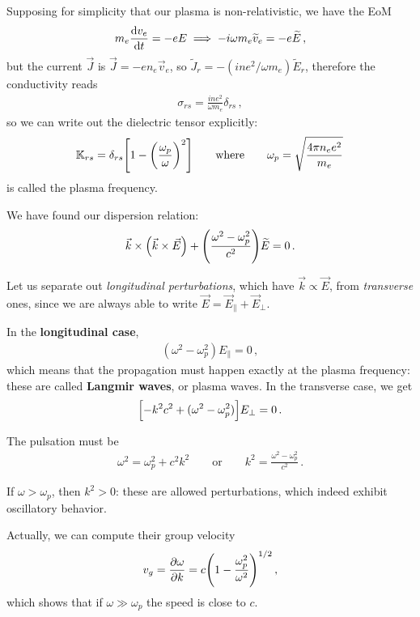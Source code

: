 \documentclass[main.tex]{subfiles}
\begin{document}
Supposing for simplicity  that our plasma is non-relativistic, we have the EoM 
%
\begin{align}
m_e \dv{v_e}{t} = - e E \implies 
- i \omega m_e \widetilde{v}_e = - e \widetilde{E}
\,,
\end{align}
%
but the current \(\vec{J}\) is \(\vec{J} = - e n_e \vec{v}_e\), so \(\widetilde{J}_r = - (i n e^2 / \omega m_e) \widetilde{E}_r\), therefore the conductivity reads 
%
\begin{align}
\sigma_{rs} = \frac{i n e^2}{\omega m_e} \delta_{rs} 
\,,
\end{align}
%
so we can write out the dielectric tensor explicitly: 
%
\begin{align}
\mathbb{K}_{rs} = \delta_{rs} \qty[ 1 - \qty(\frac{\omega_p}{\omega })^2]
\qquad \text{where} \qquad
\omega_p = \sqrt{\frac{ 4 \pi n_e e^2}{m_e}}
\,
\end{align}
%
is called the plasma frequency.

We have found our dispersion relation: 
%
\begin{align}
\vec{k} \times \qty(\vec{k} \times \vec{E})
+ \qty(\frac{\omega^2 - \omega _p^2}{c^2}) \widetilde{E} = 0
\,.
\end{align}

Let us separate out \emph{longitudinal perturbations}, which have \(\vec{k} \propto \vec{E}\), from \emph{transverse} ones, since we are always able to write \(\vec{E} = \vec{E}_\parallel + \vec{E}_\perp\). 

In the \textbf{longitudinal case},
%
\begin{align}
(\omega^2 - \omega _p^2) E_{\parallel} = 0
\,,
\end{align}
%
which means that the propagation must happen exactly at the plasma frequency: these are called \textbf{Langmir waves}, or plasma waves. 
In the transverse case, we get 
%
\begin{align}
\qty[ - k^2 c^2 + (\omega^2 - \omega _p^2)] E_\perp = 0
\,.
\end{align}

The pulsation must be 
%
\begin{align}
\omega^2 = \omega _p^2 + c^2 k^2
\qquad \text{or} \qquad
k^2 = \frac{\omega^2 - \omega^2_p}{c^2}
\,.
\end{align}

If \(\omega > \omega _p\), then \(k^2 > 0 \): these are allowed perturbations, which indeed exhibit oscillatory behavior.

Actually, we can compute their group velocity 
%
\begin{align}
v_g = \pdv{\omega }{k} = c \qty(1 - \frac{\omega_p^2}{\omega^2})^{1/2}
\,,
\end{align}
%
which shows that if \(\omega \gg \omega _p\) the speed is close to \(c\). 
\end{document}
